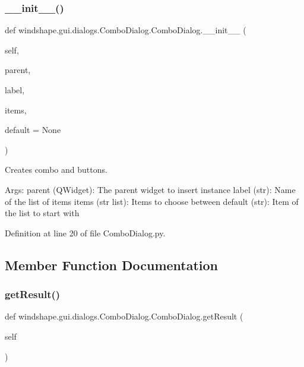 \subsubsection{\texorpdfstring{\+\_\+\+\_\+init\+\_\+\+\_\+()}{\_\_init\_\_()}}
{\footnotesize\ttfamily def windshape.\+gui.\+dialogs.\+Combo\+Dialog.\+Combo\+Dialog.\+\_\+\+\_\+init\+\_\+\+\_\+ (\begin{DoxyParamCaption}\item[{}]{self,  }\item[{}]{parent,  }\item[{}]{label,  }\item[{}]{items,  }\item[{}]{default = {\ttfamily None} }\end{DoxyParamCaption})}

\begin{DoxyVerb}Creates combo and buttons.

Args:
    parent (QWidget): The parent widget to insert instance
    label (str): Name of the list of items
    items (str list): Items to choose between
    default (str): Item of the list to start with
\end{DoxyVerb}
 

Definition at line 20 of file Combo\+Dialog.\+py.



\subsection{Member Function Documentation}
\mbox{\label{classwindshape_1_1gui_1_1dialogs_1_1_combo_dialog_1_1_combo_dialog_a870bd98cd7dda242ee7da7695fe15be8}} 
\subsubsection{\texorpdfstring{get\+Result()}{getResult()}}
{\footnotesize\ttfamily def windshape.\+gui.\+dialogs.\+Combo\+Dialog.\+Combo\+Dialog.\+get\+Result (\begin{DoxyParamCaption}\item[{}]{self }\end{DoxyParamCaption})}

